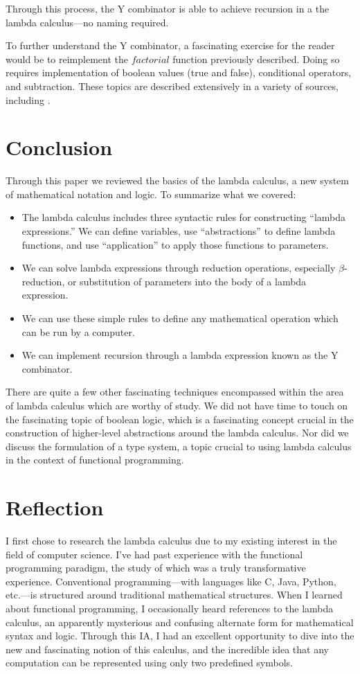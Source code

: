 \documentclass[twocolumn,titlepage,12pt]{article}
\begin{document}
Through this process, the Y combinator is able to achieve recursion in a the lambda calculus---no naming required.

To further understand the Y combinator, a fascinating exercise for the reader would be to reimplement the $factorial$ function previously described. Doing so requires implementation of boolean values (true and false), conditional operators, and subtraction. These topics are described extensively in a variety of sources, including \cite{stanfordlc}\cite{cornelllc}.

\section{Conclusion}
Through this paper we reviewed the basics of the lambda calculus, a new system of mathematical notation and logic. To summarize what we covered:
\begin{itemize}
  \item{The lambda calculus includes three syntactic rules for constructing ``lambda expressions.'' We can define variables, use ``abstractions'' to define lambda functions, and use ``application'' to apply those functions to parameters.}
  \item{We can solve lambda expressions through reduction operations, especially $\beta$-reduction, or substitution of parameters into the body of a lambda expression.}
  \item{We can use these simple rules to define any mathematical operation which can be run by a computer.}
  \item{We can implement recursion through a lambda expression known as the Y combinator.}
\end{itemize}
There are quite a few other fascinating techniques encompassed within the area of lambda calculus which are worthy of study. We did not have time to touch on the fascinating topic of boolean logic, which is a fascinating concept crucial in the construction of higher-level abstractions around the lambda calculus. Nor did we discuss the formulation of a type system, a topic crucial to using lambda calculus in the context of functional programming.

\section{Reflection}
I first chose to research the lambda calculus due to my existing interest in the field of computer science. I've had past experience with the functional programming paradigm, the study of which was a truly transformative experience. Conventional programming---with languages like C, Java, Python, etc.---is structured around traditional mathematical structures. When I learned about functional programming, I occasionally heard references to the lambda calculus, an apparently mysterious and confusing alternate form for mathematical syntax and logic.
Through this IA, I had an excellent opportunity to dive into the new and fascinating notion of this calculus, and the incredible idea that any computation can be represented using only two predefined symbols.


\end{document}
